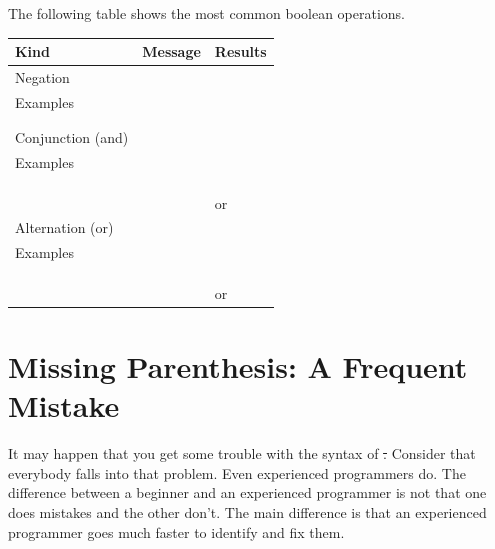  



The following  table shows the most common boolean operations. 

\begin{center}
\begin{tabular}{| p{3cm}|p{9cm} | p{2cm}|} \hline
Kind& Message&Results \\ \hline \hline

Negation&\ct{not }&\\ \hline
Examples&\ct{false not}&\ct{true}\\ \hline
&\ct{true not}& \ct{false}\\ \hline
&\ct{(\Turtle new color = Color red) not}&\ct{true}\\ \hline \hline

Conjunction (and) &\ct{\&}&\\ \hline
Examples&\ct{true \& true}&\ct{true}\\  \hline
&\ct{false \& true}&\ct{false}\\  \hline
&\ct{true \& false}&\ct{false}\\  \hline
&\ct{false \& false}&\ct{false}\\ \hline
&\ct{(a\Turtle center = 100@100) \& (a\Turtle direction = 90)}&\ct{true} or \ct{false}\\ \hline \hline

Alternation (or) &\ct{$\mid$}&\\ \hline
Examples&\ct{true $\mid$ true}&\ct{true}\\ \hline
&\ct{false $\mid$ true}&\ct{true}\\\hline
&\ct{true $\mid$ false}&\ct{true}\\ \hline
&\ct{false $\mid$ false}&\ct{false}\\ \hline
&\ct{Time now > (Time new hours: 8) $\mid$  (Date today  weekday asString = 'Sunday')}&\ct{true} or \ct{false}\\ \hline \hline
\end{tabular}
\end{center}


\section{Missing Parenthesis: A Frequent Mistake }

It may happen that you get some trouble with the syntax of \st. Consider that everybody falls into that problem. Even experienced programmers do.  The difference between a beginner and an experienced programmer is not that one does mistakes and the other don't. The main difference is that an experienced programmer goes much faster to identify and fix them. 

